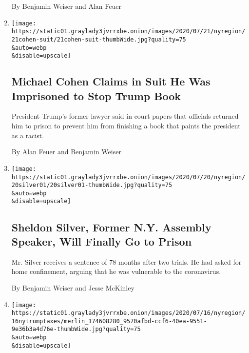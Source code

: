 \begin{enumerate}
  By Benjamin Weiser and Alan Feuer
\item
  \href{/2020/07/21/nyregion/michael-cohen-trump-book.html}{}

  \texttt{[image: https://static01.graylady3jvrrxbe.onion/images/2020/07/21/nyregion/21cohen-suit/21cohen-suit-thumbWide.jpg?quality=75\\\&auto=webp\\\&disable=upscale]}

  \hypertarget{michael-cohen-claims-in-suit-he-was-imprisoned-to-stop-trump-book}{%
  \subsection{Michael Cohen Claims in Suit He Was Imprisoned to Stop
  Trump
  Book}\label{michael-cohen-claims-in-suit-he-was-imprisoned-to-stop-trump-book}}

  President Trump's former lawyer said in court papers that officials
  returned him to prison to prevent him from finishing a book that
  paints the president as a racist.

  By Alan Feuer and Benjamin Weiser
\item
  \href{/2020/07/20/nyregion/sheldon-silver-sentencing-prison.html}{}

  \texttt{[image: https://static01.graylady3jvrrxbe.onion/images/2020/07/20/nyregion/20silver01/20silver01-thumbWide.jpg?quality=75\\\&auto=webp\\\&disable=upscale]}

  \hypertarget{sheldon-silver-former-ny-assembly-speaker-will-finally-go-to-prison}{%
  \subsection{Sheldon Silver, Former N.Y. Assembly Speaker, Will Finally
  Go to
  Prison}\label{sheldon-silver-former-ny-assembly-speaker-will-finally-go-to-prison}}

  Mr. Silver receives a sentence of 78 months after two trials. He had
  asked for home confinement, arguing that he was vulnerable to the
  coronavirus.

  By Benjamin Weiser and Jesse McKinley
\item
  \href{/2020/07/16/nyregion/donald-trump-taxes-cyrus-vance.html}{}

  \texttt{[image: https://static01.graylady3jvrrxbe.onion/images/2020/07/16/nyregion/16nytrumptaxes/merlin\_174608280\_9570afbd-ccf6-40ea-9551-9e36b3a4d76e-thumbWide.jpg?quality=75\\\&auto=webp\\\&disable=upscale]}

  \hypertarget{da-accuses-trump-of-delay-strategy-in-fight-over-tax-returns}{%
}
\end{enumerate}

